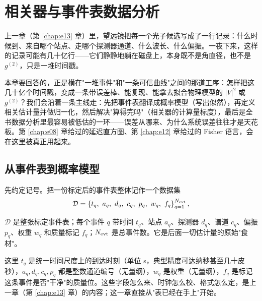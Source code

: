 \chapter{相关器与事件表数据分析}
\label{chap:e14}

\begin{chapteropening}
上一章（第 \ref{chap:e13} 章）里，望远镜把每一个光子候选写成了一行记录：什么时候到、来自哪个站点、走哪个探测器通道、什么波长、什么偏振。一夜下来，这样的记录可能有几十亿行——它们静静地躺在磁盘上，本身既不是角直径，也不是 \(g^{(2)}\)，只是一堆时间戳。

本章要回答的，正是横在"一堆事件"和"一条可信曲线"之间的那道工序：怎样把这几十亿个时间戳，变成一条带误差棒、能复现、能拿去拟合物理模型的 \(|V|^2\) 或 \(g^{(2)}\)？我们会沿着一条主线走：先把事件表翻译成概率模型（写出似然），再定义相关估计量并做归一化，然后解决"算得完吗"（相关器的计算量标度），最后是全书数据分析里最容易被低估的一环——误差从哪来、为什么系统误差往往才是天花板。第 \ref{chap:e08} 章给过的延迟直方图、第 \ref{chap:e12} 章给过的 Fisher 语言，会在这里被真正用起来。
\end{chapteropening}

\section{从事件表到概率模型}
\label{sec:e14-model}

先约定记号。把一份标定后的事件表整体记作一个数据集
\begin{equation}
  \mathcal{D}
  =
  \left\{
  t_q,\ a_q,\ d_q,\ c_q,\ p_q,\ w_q,\ f_q
  \right\}_{q=1}^{N_{\rm evt}} ,
  \label{eq:e14-data}
\end{equation}
\begin{formulaexplain}
\(\mathcal D\) 是整张标定事件表；每个事件 \(q\) 带时间 \(t_q\)、站点 \(a_q\)、探测器 \(d_q\)、谱道 \(c_q\)、偏振 \(p_q\)、权重 \(w_q\) 和质量标记 \(f_q\)；\(N_{\rm evt}\) 是总事件数。它是后面一切估计量的原始"食材"。
\end{formulaexplain}
这里 \(t_q\) 是统一时间尺度上的到达时刻（单位 s，典型精度可达纳秒甚至几十皮秒），\(a_q,d_q,c_q,p_q\) 都是整数通道编号（无量纲），\(w_q\) 是权重（无量纲），\(f_q\) 是标记这条事件是否"干净"的质量位。这些字段怎么来、时钟怎么校、格式怎么定，是上一章（第 \ref{chap:e13} 章）的内容；这一章直接从"表已经在手上"开始。


